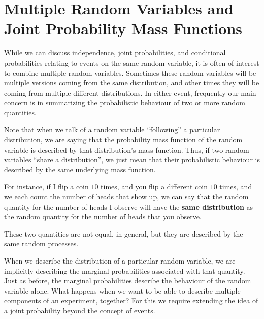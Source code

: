 \documentclass[
  letterpaper,
  DIV=11,
  numbers=noendperiod]{scrreprt}
\theoremstyle{definition}
\theoremstyle{definition}
\theoremstyle{definition}
\theoremstyle{remark}
\begin{document}
\section{Multiple Random Variables and Joint Probability Mass
Functions}\label{multiple-random-variables-and-joint-probability-mass-functions}

While we can discuss independence, joint probabilities, and conditional
probabilities relating to events on the same random variable, it is
often of interest to combine multiple random variables. Sometimes these
random variables will be multiple versions coming from the same
distribution, and other times they will be coming from multiple
different distributions. In either event, frequently our main concern is
in summarizing the probabilistic behaviour of two or more random
quantities.

\begin{tcolorbox}[enhanced jigsaw, coltitle=black, colframe=quarto-callout-note-color-frame, colbacktitle=quarto-callout-note-color!10!white, bottomrule=.15mm, opacitybacktitle=0.6, colback=white, toptitle=1mm, arc=.35mm, leftrule=.75mm, bottomtitle=1mm, opacityback=0, breakable, rightrule=.15mm, title={A Discussion of Distributional Language}, left=2mm, titlerule=0mm, toprule=.15mm]

Note that when we talk of a random variable ``following'' a particular
distribution, we are saying that the probability mass function of the
random variable is described by that distribution's mass function. Thus,
if two random variables ``share a distribution'', we just mean that
their probabilistic behaviour is described by the same underlying mass
function.

For instance, if I flip a coin \(10\) times, and you flip a different
coin \(10\) times, and we each count the number of heads that show up,
we can say that the random quantity for the number of heads I observe
will have the \textbf{same distribution} as the random quantity for the
number of heads that you observe.

These two quantities are not equal, in general, but they are described
by the same random processes.

\end{tcolorbox}

When we describe the distribution of a particular random variable, we
are implicitly describing the marginal probabilities associated with
that quantity. Just as before, the marginal probabilities describe the
behaviour of the random variable alone. What happens when we want to be
able to describe multiple components of an experiment, together? For
this we require extending the idea of a joint probability beyond the
concept of events.
\end{document}

